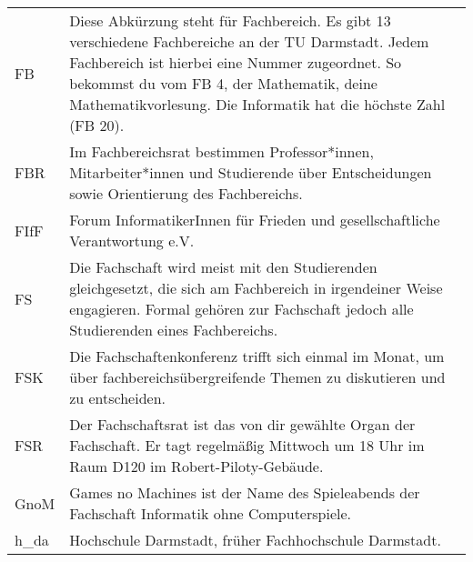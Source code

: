 \begin{longtable}{p{20mm}p{85mm}}
    FB           & Diese Abkürzung steht für Fachbereich. Es gibt 13 verschiedene Fachbereiche an der TU Darmstadt. Jedem Fachbereich ist hierbei eine Nummer zugeordnet. So bekommst du vom FB 4, der Mathematik, deine Mathematikvorlesung. Die Informatik hat die höchste Zahl (FB 20). \\
    FBR          & Im Fachbereichsrat bestimmen Professor*innen, Mitarbeiter*innen und Studierende über Entscheidungen sowie Orientierung des Fachbereichs.                                                                                                                                \\
    FIfF         & Forum InformatikerInnen für Frieden und gesellschaftliche Verantwortung e.V.                                                                                                                                                                                            \\
    FS           & Die Fachschaft wird meist mit den Studierenden gleichgesetzt, die sich am Fachbereich in irgendeiner Weise engagieren. Formal gehören zur Fachschaft jedoch alle Studierenden eines Fachbereichs.                                                                       \\
    FSK          & Die Fachschaftenkonferenz trifft sich einmal im Monat, um über fachbereichsübergreifende Themen zu diskutieren und zu entscheiden.                                                                                                                                      \\
    FSR          & Der Fachschaftsrat ist das von dir gewählte Organ der Fachschaft. Er tagt regelmäßig Mittwoch um 18 Uhr im Raum D120 im Robert-Piloty-Gebäude.                                                                                                                          \\
    GnoM         & Games no Machines ist der Name des Spieleabends der Fachschaft Informatik ohne Computerspiele.                                                                                                                                                                          \\
    h\_da        & Hochschule Darmstadt, früher Fachhochschule Darmstadt.                                                                                                                                                                                                                  \\

\end{longtable}
